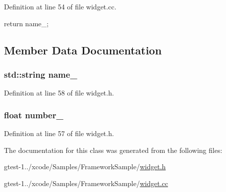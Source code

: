 \-Definition at line 54 of file widget.\-cc.


\begin{DoxyCode}
                                       {
  return name_;
}
\end{DoxyCode}


\subsection{\-Member \-Data \-Documentation}
\hypertarget{classWidget_a4d739cc5d335052eb9f5b2ca559b81d1}{
\subsubsection[{name\-\_\-}]{\setlength{\rightskip}{0pt plus 5cm}std\-::string {\bf name\-\_\-}}}\label{dd/ddb/classWidget_a4d739cc5d335052eb9f5b2ca559b81d1}


\-Definition at line 58 of file widget.\-h.

\hypertarget{classWidget_a9a0a06520c913b964c1c812d6beae9a3}{
\subsubsection[{number\-\_\-}]{\setlength{\rightskip}{0pt plus 5cm}float {\bf number\-\_\-}}}\label{dd/ddb/classWidget_a9a0a06520c913b964c1c812d6beae9a3}


\-Definition at line 57 of file widget.\-h.



\-The documentation for this class was generated from the following files\-:\begin{DoxyCompactItemize}
\item 
gtest-\/1../xcode/\-Samples/\-Framework\-Sample/\hyperlink{widget_8h}{widget.\-h}\item 
gtest-\/1../xcode/\-Samples/\-Framework\-Sample/\hyperlink{widget_8cc}{widget.\-cc}\end{DoxyCompactItemize}
